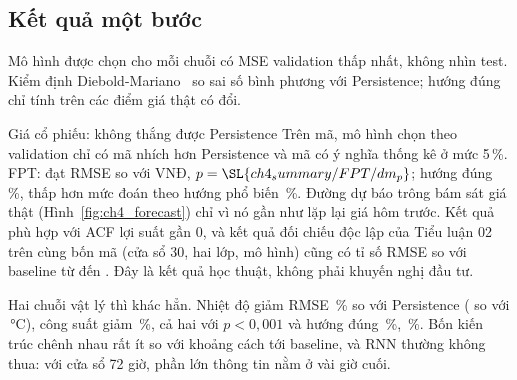 \subsection{Kết quả một bước}
Mô hình được chọn cho mỗi chuỗi có MSE validation thấp nhất, không nhìn test. Kiểm định Diebold-Mariano~\cite{diebold1995} so sai số bình phương với Persistence; hướng đúng chỉ tính trên các điểm giá thật có đổi.


\begin{phathien}{Giá cổ phiếu: không thắng được Persistence}
Trên  mã, mô hình chọn theo validation chỉ có  mã nhích hơn Persistence và  mã có ý nghĩa thống kê ở mức 5\,\%. FPT:  đạt RMSE  so với  VNĐ, $p=\SL{ch4_summary/FPT/dm_p}$; hướng đúng \,\%, thấp hơn mức đoán theo hướng phổ biến \,\%. Đường dự báo trông bám sát giá thật (Hình~\ref{fig:ch4_forecast}) chỉ vì nó gần như lặp lại giá hôm trước. Kết quả phù hợp với ACF lợi suất gần 0, và kết quả đối chiếu độc lập của Tiểu luận 02 trên cùng bốn mã (cửa sổ 30, hai lớp,  mô hình) cũng có tỉ số RMSE so với baseline từ  đến . Đây là kết quả học thuật, không phải khuyến nghị đầu tư.
\end{phathien}

Hai chuỗi vật lý thì khác hẳn. Nhiệt độ giảm RMSE \,\% so với Persistence ( so với \,°C), công suất giảm \,\%, cả hai với $p<0{,}001$ và hướng đúng \,\%, \,\%. Bốn kiến trúc chênh nhau rất ít so với khoảng cách tới baseline, và RNN thường không thua: với cửa sổ 72 giờ, phần lớn thông tin nằm ở vài giờ cuối.


